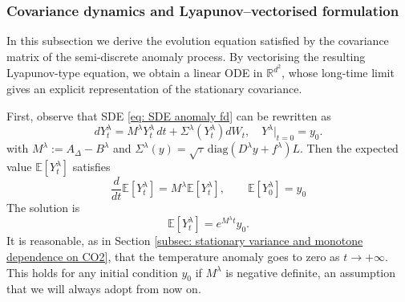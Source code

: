 \documentclass[10pt]{amsart}
\numberwithin{equation}{section}
\begin{document}
\subsubsection{Covariance dynamics and Lyapunov–vectorised formulation}
In this subsection we derive the evolution equation satisfied by the covariance matrix of the semi-discrete anomaly process. By vectorising the resulting Lyapunov-type equation, we obtain a linear ODE in $\mathbb{R}^{d^2}$, whose long-time limit gives an explicit representation of the stationary covariance.

First, observe that SDE \eqref{eq: SDE anomaly fd} can be rewritten as
$$
dY_t^\lambda  = M^\lambda Y_t^\lambda \, dt  + \Sigma^\lambda(Y_t ^\lambda)  dW_t, \quad Y ^\lambda|_{t = 0} = y_0.
$$
with $M^\lambda:= A_\Delta - B^\lambda $ and $\Sigma^\lambda (y) = \sqrt{ \tau }\,  \mathrm{diag} (D^\lambda y + f^\lambda)L.$ Then the expected value $\mathbb{E}[Y_t^\lambda]$ satisfies
$$
\frac{d}{dt}\mathbb{E}[Y_t ^\lambda] = M^\lambda \mathbb{E}[Y_t ^\lambda], \qquad \mathbb{E}[Y_0^\lambda] = y_0
$$
The solution is
$$
\mathbb{E}[Y_t ^\lambda] = e^{M^\lambda t} y_0.
$$
It is reasonable, as in Section \ref{subsec: stationary variance and monotone dependence on CO2}, that the temperature anomaly goes to zero as $t \to +\infty $. This holds for any initial condition $y_0$ if $M^\lambda $ is negative definite, an assumption that we will always adopt from now on.
\end{document}
